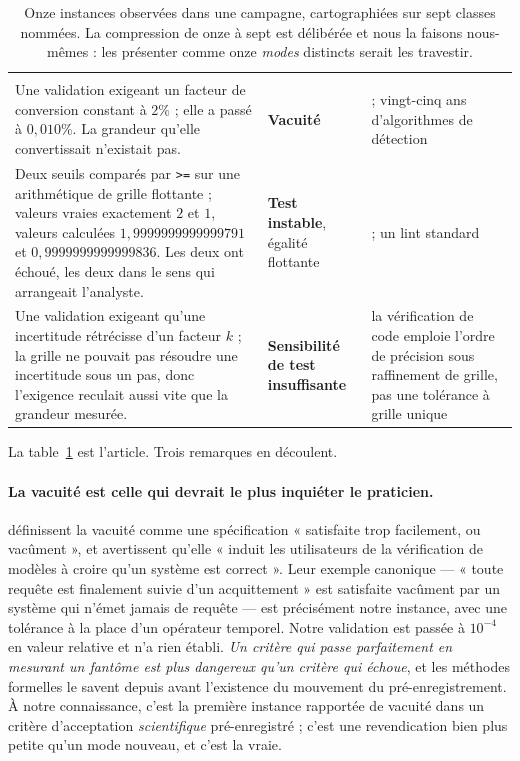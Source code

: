 \documentclass[11pt,a4paper]{article}
\begin{document}
\begin{table}[t]
\begin{tabular}{p{4.9cm}p{3.6cm}p{5.9cm}}
 & & \\
\addlinespace
Une validation exigeant un facteur de conversion constant à $2\%$ ; elle a passé à
$0{,}010\%$. La grandeur qu'elle convertissait n'existait pas. &
\textbf{Vacuité} & \citet{beer1997,kupferman2003} ; vingt-cinq ans d'algorithmes de détection \\
\addlinespace
Deux seuils comparés par \texttt{>=} sur une arithmétique de grille flottante ; valeurs vraies
exactement $2$ et $1$, valeurs calculées $1{,}9999999999999791$ et $0{,}9999999999999836$. Les
deux ont échoué, les deux dans le sens qui arrangeait l'analyste. &
\textbf{Test instable}, égalité flottante & \citet{luo2014} ; un lint standard \\
\addlinespace
Une validation exigeant qu'une incertitude rétrécisse d'un facteur $k$ ; la grille ne pouvait
pas résoudre une incertitude sous un pas, donc l'exigence reculait aussi vite que la grandeur
mesurée. &
\textbf{Sensibilité de test insuffisante} & la vérification de code emploie l'ordre de
précision sous raffinement de grille, pas une tolérance à grille unique
\citep{salari2000,roache1998} \\
\bottomrule
\end{tabular}
\caption{Onze instances observées dans une campagne, cartographiées sur sept classes nommées.
La compression de onze à sept est délibérée et nous la faisons nous-mêmes : les présenter
comme onze \emph{modes} distincts serait les travestir.}
\label{tab:mapping}
\end{table}

La table~\ref{tab:mapping} est l'article. Trois remarques en découlent.

\paragraph{La vacuité est celle qui devrait le plus inquiéter le praticien.} \citet{beer1997}
définissent la vacuité comme une spécification « satisfaite trop facilement, ou vacûment », et
avertissent qu'elle « induit les utilisateurs de la vérification de modèles à croire qu'un
système est correct ». Leur exemple canonique --- « toute requête est finalement suivie d'un
acquittement » est satisfaite vacûment par un système qui n'émet jamais de requête --- est
précisément notre instance, avec une tolérance à la place d'un opérateur temporel. Notre
validation est passée à $10^{-4}$ en valeur relative et n'a rien établi. \emph{Un critère qui
passe parfaitement en mesurant un fantôme est plus dangereux qu'un critère qui échoue}, et les
méthodes formelles le savent depuis avant l'existence du mouvement du pré-enregistrement. À
notre connaissance, c'est la première instance rapportée de vacuité dans un critère
d'acceptation \emph{scientifique} pré-enregistré ; c'est une revendication bien plus petite
qu'un mode nouveau, et c'est la vraie.
\end{document}
